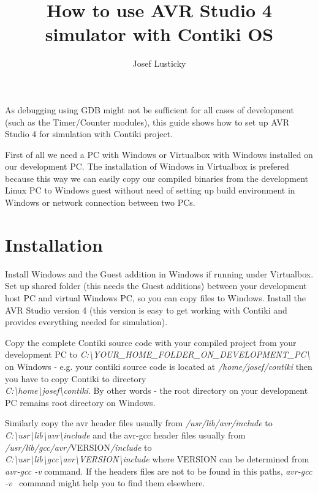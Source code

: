 \documentclass{article}
\begin{document}
\title{How to use AVR Studio 4 simulator with Contiki OS}
\author{Josef Lusticky}

\maketitle

As debugging using GDB might not be sufficient for all cases of development (such as the Timer/Counter modules),
this guide shows how to set up AVR Studio 4 for simulation with Contiki project.

First of all we need a PC with Windows or Virtualbox with Windows installed on our development PC.
The installation of Windows in Virtualbox is prefered because this way we can easily copy our compiled binaries
from the development Linux PC to Windows guest
without need of setting up build environment in Windows or network connection between two PCs.

\section{Installation}
Install Windows and the Guest addition in Windows if running under Virtualbox.
Set up shared folder (this needs the Guest additions) between your development host PC and virtual Windows PC, so you can copy files to Windows.
Install the AVR Studio version 4 (this version is easy to get working with Contiki and provides everything needed for simulation).

Copy the complete Contiki source code with your compiled project from your development PC to
{\it{C:\textbackslash YOUR\_HOME\_FOLDER\_ON\_DEVELOPMENT\_PC\textbackslash}}
on Windows - e.g. your contiki source code is located at {\it{/home/josef/contiki}}
then you have to copy Contiki to directory \\
{\it{C:\textbackslash home\textbackslash josef\textbackslash contiki}}.
By other words - the root directory on your development PC remains root directory on Windows.

Similarly copy the avr header files usually from {\it{/usr/lib/avr/include}} to
{\it{C:\textbackslash usr\textbackslash lib\textbackslash avr\textbackslash include}}
and the avr-gcc header files usually from {\it{/usr/lib/gcc/avr/}}VERSION{\it{/include}} to \\
{\it{C:\textbackslash usr\textbackslash lib\textbackslash gcc\textbackslash avr\textbackslash VERSION\textbackslash include}}
where VERSION can be determined from {\it{avr-gcc -v}} command.
If the headers files are not to be found in this paths, {\it{avr-gcc -v }} command might help you to find them elsewhere.
\end{document}
